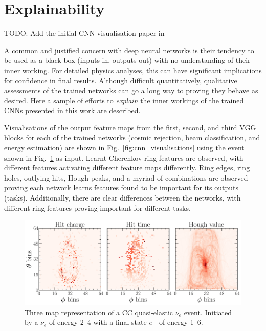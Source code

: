\section{Explainability} %
\label{sec:results_explain} %

TODO: Add the initial CNN visualisation paper in~\cite{zeiler2013}

A common and justified concern with deep neural networks is their tendency to be used as a black
box (inputs in, outputs out) with no understanding of their inner working. For detailed physics
analyses, this can have significant implications for confidence in final results. Although
difficult quantitatively, qualitative assessments of the trained networks can go a long way to
proving they behave as desired. Here a sample of efforts to \emph{explain} the inner workings of
the trained CNNs presented in this work are described.

Visualisations of the output feature maps from the first, second, and third VGG blocks for each of
the trained networks (cosmic rejection, beam classification, and energy estimation) are shown in
Fig.~\ref{fig:cnn_visualisations} using the event shown in Fig.~\ref{fig:explain_example_event} as
input. Learnt Cherenkov ring features are observed, with different features activating different
feature maps differently. Ring edges, ring holes, outlying hits, Hough peaks, and a myriad of
combinations are observed proving each network learns features found to be important for its
outputs (tasks). Additionally, there are clear differences between the networks, with different
ring features proving important for different tasks.

\begin{figure} %
    \includegraphics[width=\textwidth]{diagrams/7-results/explain_example_event.pdf}
    \caption[Example CC quasi-elastic $\nu_{e}$ event for explainability]
    {Three map representation of a CC quasi-elastic $\nu_{e}$ event. Initiated by a $\nu_{e}$ of
        energy \unit{2.4}{\GeV} with a final state $e^{-}$ of energy \unit{1.6}{\GeV}.}
    \label{fig:explain_example_event}
\end{figure}

